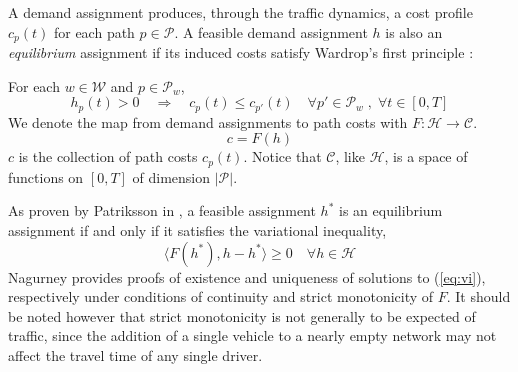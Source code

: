 A demand assignment produces, through the traffic dynamics, a cost profile $c_p(t)$ for each path $p\in\mathcal{P}$. 
A feasible demand assignment $h$ is also an \textit{equilibrium} assignment if its induced costs satisfy Wardrop's first principle \cite{wardrop1952some}: 

\noindent For each $w\in\mathcal{W}$ and $p\in \mathcal{P}_w$,
\begin{equation}
h_p(t) > 0 \quad
 \Rightarrow \quad c_p(t) \leq c_{p'}(t) \quad \forall p'\in\mathcal{P}_w \;,\; 
 \forall t\in[0,T]
\end{equation}
We denote the map from demand assignments to path costs with $F : \mathcal{H}\rightarrow \mathcal{C}$. 
\begin{equation}
c = F(h)
\end{equation}
$c$ is the collection of path costs $c_p(t)$. Notice that $\mathcal{C}$, like $\mathcal{H}$, is a space of functions on $[0,T]$ of dimension $|\mathcal{P}|$. 


As proven by Patriksson in \cite{patriksson2015traffic}, a feasible assignment $h^*$ is an equilibrium assignment if and only if \XXX it satisfies the variational inequality,
\begin{equation}
\label{eq:vi}
\langle F(h^*), h-h^* \rangle \geq 0 \quad \forall h\in\mathcal{H}
\end{equation}
Nagurney \cite{nagurney2013network} provides proofs of existence and uniqueness of solutions to (\ref{eq:vi}), respectively under conditions of continuity and strict monotonicity of $F$. It should be noted however that strict monotonicity is not generally to be expected of traffic, since the addition of a single vehicle to a nearly empty network may not affect the travel time of any single driver.

